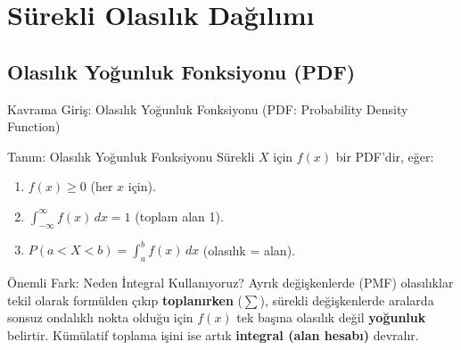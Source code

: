 \documentclass[light]{lutbeamer}
\begin{document}
\section{Sürekli Olasılık Dağılımı}
\subsection{Olasılık Yoğunluk Fonksiyonu (PDF)}

\begin{frame}{Kavrama Giriş: Olasılık Yoğunluk Fonksiyonu (PDF: Probability Density Function)}
\begin{block}{Tanım: Olasılık Yoğunluk Fonksiyonu}
  Sürekli $X$ için $f(x)$ bir PDF'dir, eğer:
  \begin{enumerate}
    \item $f(x) \ge 0$ \quad (her $x$ için).
    \item $\displaystyle\int_{-\infty}^{\infty} f(x)\,dx = 1$ \quad (toplam alan 1).
    \item $\displaystyle P(a < X < b) = \int_{a}^{b} f(x)\,dx$ \quad (olasılık = alan).
  \end{enumerate}
\end{block}

\begin{alertblock}{Önemli Fark: Neden İntegral Kullanıyoruz?}
  Ayrık değişkenlerde (PMF) olasılıklar tekil olarak formülden çıkıp \textbf{toplanırken} ($\sum$), sürekli değişkenlerde aralarda sonsuz ondalıklı nokta olduğu için $f(x)$ tek başına olasılık değil \textbf{yoğunluk} belirtir. Kümülatif toplama işini ise artık \textbf{integral (alan hesabı)} devralır.
\end{alertblock}
\end{frame}
\end{document}
